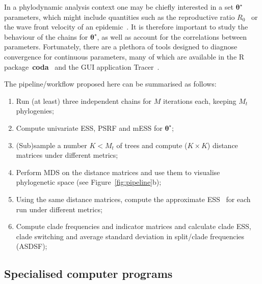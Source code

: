 In a phylodynamic analysis context one may be chiefly interested in a set $\boldsymbol\theta^\star$ parameters, which might include quantities such as the reproductive ratio $R_0$~\citep{Stadler2011} or the wave front velocity of an epidemic~\citep{Lemey2010,Pybus2012}.
It is therefore important to study the behaviour of the chains for $\boldsymbol\theta^\star$, as well as account for the correlations between parameters.
Fortunately, there are a plethora of tools designed to diagnose convergence for continuous parameters, many of which are available in the R package~\textbf{coda}~\citep{Plummer2006} and the GUI application Tracer~\citep{Rambaut2018}.

The pipeline/workflow proposed here can be summarised as follows:
\begin{enumerate}
 \item Run (at least) three independent chains for $M$ iterations each, keeping $M_t$ phylogenies;
 \item Compute univariate ESS, PSRF and mESS for $\boldsymbol\theta^\star$;
 \item (Sub)sample a number $K < M_t$ of trees and compute ($ K \times K$) distance matrices under different metrics;
 \item Perform MDS on the distance matrices and use them to visualise phylogenetic space (see Figure~\ref{fig:pipeline}b);
 \item Using the same distance matrices, compute the approximate ESS~\citep{Lanfear2016} for each run under different metrics;
 \item Compute clade frequencies and indicator matrices and calculate clade ESS, clade switching and average standard deviation in split/clade frequencies (ASDSF);
\end{enumerate}

\subsection*{Specialised computer programs}

